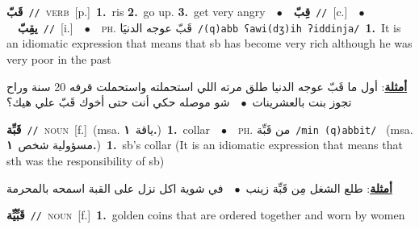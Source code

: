 \documentclass[10pt,a4paper,twoside]{article} %
\begin{document}
\begin{multicols}{2}
{\setlength\topsep{0pt}\textbf{\foreignlanguage{arabic}{قَبّ}}\ {\color{gray}\texttt{//}\color{black}}\ \textsc{verb}\ [p.]\ \textbf{1.}~ris  \textbf{2.}~go up.  \textbf{3.}~get very angry\ \ $\bullet$\ \ \setlength\topsep{0pt}\textbf{\foreignlanguage{arabic}{قِبّ}}\ {\color{gray}\texttt{//}\color{black}}\ [c.]\ \ $\bullet$\ \ \setlength\topsep{0pt}\textbf{\foreignlanguage{arabic}{يقِبّ}}\ {\color{gray}\texttt{//}\color{black}}\ [i.]\ \ $\bullet$\ \ \textsc{ph.} \color{gray} \foreignlanguage{arabic}{قَبّ عوجه الدنيَا}\color{black}\ {\color{gray}\texttt{/{\sffamily (q)abb ʕawi(dʒ)ih ʔiddinja}/}\color{black}}\ \textbf{1.}~It is an idiomatic expression that means that sb has become very rich although he was very poor in the past\  \begin{flushright}\color{gray}\foreignlanguage{arabic}{\textbf{\underline{\foreignlanguage{arabic}{أمثلة}}}: أول ما قَبّ عوجه الدنيا طلق مرته اللي استحملته واستحملت قرفه 20 سنة وراح تجوز بنت بالعشرينات\ $\bullet$\ \  شو موصله حكي أنت حتى أخوك قَبّ علي هيك؟}\end{flushright}\color{black}} \vspace{2mm}

{\setlength\topsep{0pt}\textbf{\foreignlanguage{arabic}{قَبِّة}}\ {\color{gray}\texttt{//}\color{black}}\ \textsc{noun}\ [f.]\ \color{gray}(msa. \foreignlanguage{arabic}{ياقة}~\foreignlanguage{arabic}{\textbf{١.}})\color{black}\ \textbf{1.}~collar\ \ $\bullet$\ \ \textsc{ph.} \color{gray} \foreignlanguage{arabic}{من قَبِّة}\color{black}\ {\color{gray}\texttt{/{\sffamily min (q)abbit}/}\color{black}}\ \color{gray} (msa. \foreignlanguage{arabic}{مسؤولية شخص}~\foreignlanguage{arabic}{\textbf{١.}})\color{black}\ \textbf{1.}~sb's collar (It is an idiomatic expression that means that sth was the responsibility of sb)\  \begin{flushright}\color{gray}\foreignlanguage{arabic}{\textbf{\underline{\foreignlanguage{arabic}{أمثلة}}}: طلع الشغل مِن قَبِّة زينب\ $\bullet$\ \  في شوية اكل نزل على القبة اسمحه بالمحرمة}\end{flushright}\color{black}} \vspace{2mm}

{\setlength\topsep{0pt}\textbf{\foreignlanguage{arabic}{قَبِّيِّة}}\ {\color{gray}\texttt{//}\color{black}}\ \textsc{noun}\ [f.]\ \textbf{1.}~golden coins that are ordered together and worn by women\ } \vspace{2mm}


\end{multicols}
\end{document}
